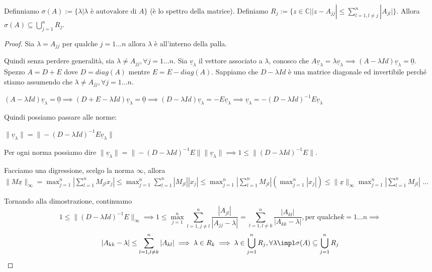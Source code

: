 \begin{teorema} 
    Definniamo $\sigma(A):=\{\lambda | \lambda\text{ è autovalore di }A\}$ (è lo 
    spettro della matrice). Definiamo $R_j:=\{z\in \mathbb{C}| |z-A_{jj}| \le \sum_{l=1, l\ne j}^{n} |A_{jl}|\}$.
    Allora $\sigma(A)\subseteq \bigcup_{j=1}^n R_j$. 
    \begin{proof}
        Sia $\lambda = A_{jj}$ per qualche $j=1\dots n$ allora $\lambda$ è all'interno
        della palla.
        
        Quindi senza perdere generalità, sia $\lambda \ne A_{jj},\forall j=1\dots n$.
        Sia $\underline{v}_\lambda$ il vettore associato a $\lambda$, conosco che 
        $A \underline{v}_\lambda = \lambda \underline{v}_\lambda \implies (A-\lambda Id)\underline{v}_\lambda = \underline{0}$.
        Spezzo $A=D+E$ dove $D= diag(A)$ mentre $E= E-diag(A)$. Sappiamo che $D-\lambda Id$ è
        una matrice diagonale ed invertibile perché stiamo assumendo che $\lambda \ne A_{jj}, \forall j =1\dots n$.
        
        $(A-\lambda Id)\underline{v}_\lambda = \underline{0} \implies (D+E-\lambda Id)\underline{v}_\lambda = \underline{0}\implies (D-\lambda Id)\underline{v}_\lambda = -E\underline{v}_\lambda \implies
        \underline{v}_\lambda = -(D-\lambda Id)^{-1}E\underline{v}_\lambda$

        Quindi possiamo passare alle norme:
        
        $\|\underline{v}_\lambda\| = \|-(D-\lambda Id)^{-1}E\underline{v}_\lambda\|$

        Per ogni norma possiamo dire 
        $\|\underline{v}_\lambda\| = \|-(D-\lambda Id)^{-1}E\|\|\underline{v}_\lambda\|\implies 1\le \|(D-\lambda Id)^{-1}E\|$.
        
        Facciamo una digressione, scelgo la norma $\infty$, allora $\|M\underline{x}\|_\infty = \max_{j=1}^n|\sum_{l=1}^{n}M_{jl}x_j|\le \max_{j=1}^n\sum_{l=1}^{n}|M_{jl}||x_j|\le 
        \max_{j=1}^n|\sum_{l=1}^{n}M_{jl}|(\max_{j=1}^n|x_j|)\le\|\underline{x}\|_\infty  \max_{j=1}^n|\sum_{l=1}^{n}M_{jl}|$
        $\dots$

        Tornando alla dimostrazione, continuamo
        $$1\le \|(D-\lambda Id)^{-1}E\|_\infty \implies 1 \le \max_{j=1}^n\sum_{l=1,j\ne l}^{n} \frac{|A_{jl}|}{|A_{jj}-\lambda|}
        = \sum_{l=1,l\ne k}^{n} \frac{|A_{kl}|}{|A_{kk}-\lambda|}, \text{per qualche}k = 1\dots n\implies$$
        $$|A_{kk}-\lambda| \le \sum_{l=1,l\ne k}^{n} |A_{kl}| \implies \lambda \in R_k\implies \lambda \in \bigcup_{j=1}^n R_j, \forall \lambda \impl 
        \sigma(A)\subseteq \bigcup_{j=1}^n R_j$$

    \end{proof}
\end{teorema}


